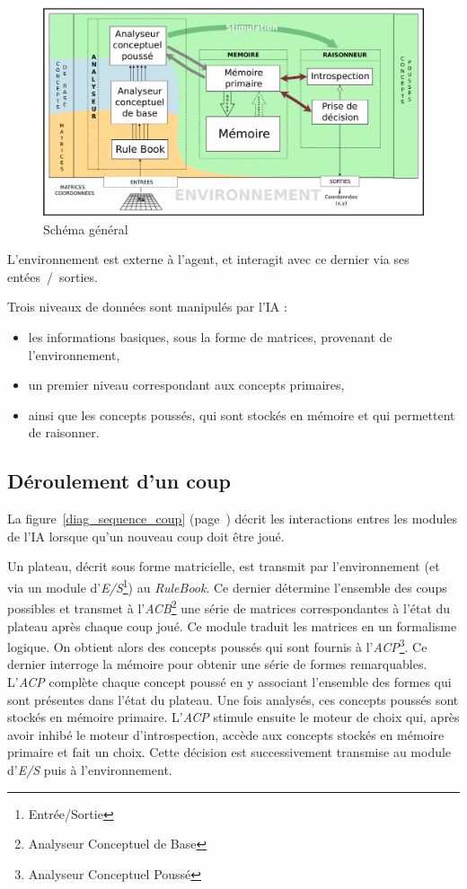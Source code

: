 \begin{figure}[H] 
\includegraphics[width=\textwidth]{files/simplified_general_diagram} 
\caption{Schéma général} 
\label{schema_general}
\end{figure}

L'environnement est externe à l'agent, et interagit avec ce dernier via ses entées~/~sorties.

Trois niveaux de données sont manipulés par l'IA :
\begin{itemize}
\item les informations basiques, sous la forme de matrices, provenant de l'environnement,
\item un premier niveau correspondant aux concepts primaires,
\item ainsi que les concepts poussés, qui sont stockés en mémoire et qui permettent de raisonner.
\end{itemize}

\subsection{Déroulement d'un coup}

La figure~\ref{diag_sequence_coup} (page~\pageref{diag_sequence_coup}) décrit les interactions entres les modules de l'IA lorsque qu'un nouveau coup doit être joué.

Un plateau, décrit sous forme matricielle, est transmit par l'environnement (et via un module d'\emph{E/S}\footnote{Entrée/Sortie}) au \emph{RuleBook}. Ce dernier détermine l'ensemble des coups possibles et transmet à l'\emph{ACB}\footnote{Analyseur Conceptuel de Base} une série de matrices correspondantes à l'état du plateau après chaque coup joué. Ce module traduit les matrices en un formalisme logique. On obtient alors des concepts poussés qui sont fournis à l'\emph{ACP}\footnote{Analyseur Conceptuel Poussé}. Ce dernier interroge la mémoire pour obtenir une série de formes remarquables. L'\emph{ACP} complète chaque concept poussé en y associant l'ensemble des formes qui sont présentes dans l'état du plateau. Une fois analysés, ces concepts poussés sont stockés en mémoire primaire. L'\emph{ACP} stimule ensuite le moteur de choix qui, après avoir inhibé le moteur d'introspection, accède aux concepts stockés en mémoire primaire et fait un choix. Cette décision est successivement transmise au module d'\emph{E/S} puis à l'environnement.

